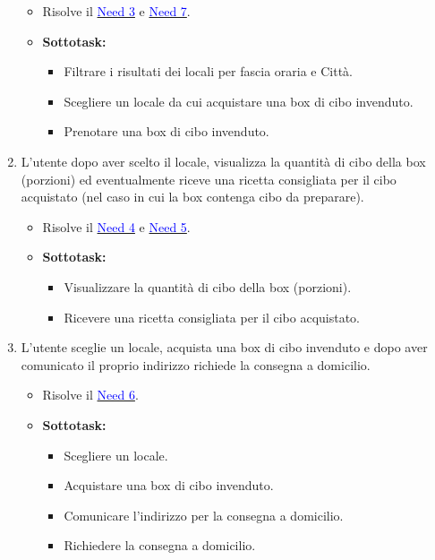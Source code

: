 \documentclass{article}
\begin{document}
\begin{enumerate}[label=\textbf{Task-\arabic*}]
    \begin{itemize}
        \item Risolve il \hyperref[need3]{\textcolor{blue}{Need 3}} e \hyperref[need7]{\textcolor{blue}{Need 7}}.
        \item \textbf{Sottotask:} 
        \begin{itemize}
            \item Filtrare i risultati dei locali per fascia oraria e Città.
            \item Scegliere un locale da cui acquistare una box di cibo invenduto.
            \item Prenotare una box di cibo invenduto.
        \end{itemize}
    \end{itemize}
    \item L'utente dopo aver scelto il locale, visualizza la quantità di cibo della box (porzioni) ed eventualmente riceve una ricetta consigliata per il cibo acquistato (nel caso in cui la box contenga cibo da preparare).
    \begin{itemize}
        \item Risolve il \hyperref[need4]{\textcolor{blue}{Need 4}} e \hyperref[need5]{\textcolor{blue}{Need 5}}.
        \item \textbf{Sottotask:} 
        \begin{itemize}
            \item Visualizzare la quantità di cibo della box (porzioni).
            \item Ricevere una ricetta consigliata per il cibo acquistato.
        \end{itemize}
    \end{itemize}
    \item L'utente sceglie un locale, acquista una box di cibo invenduto e dopo aver comunicato il proprio indirizzo richiede la consegna a domicilio.
    \begin{itemize}
        \item Risolve il \hyperref[need6]{\textcolor{blue}{Need 6}}.
        \item \textbf{Sottotask:} 
        \begin{itemize}
            \item Scegliere un locale.
            \item Acquistare una box di cibo invenduto.
            \item Comunicare l'indirizzo per la consegna a domicilio.
            \item Richiedere la consegna a domicilio.

\end{itemize}
\end{itemize}
\end{enumerate}
\end{document}
